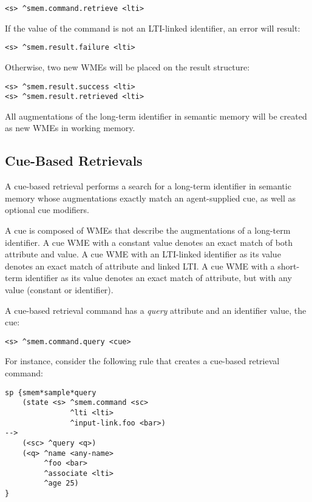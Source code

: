 \begin{verbatim}
<s> ^smem.command.retrieve <lti>
\end{verbatim}

If the value of the command is not an LTI-linked identifier, an error will result: 

\begin{verbatim}
<s> ^smem.result.failure <lti>
\end{verbatim}

Otherwise, two new WMEs will be placed on the result structure:

\begin{verbatim}
<s> ^smem.result.success <lti>
<s> ^smem.result.retrieved <lti>
\end{verbatim}

All augmentations of the long-term identifier in semantic memory will be created as new WMEs in working memory.

\subsection{Cue-Based Retrievals}
A cue-based retrieval performs a search for a long-term identifier in semantic memory whose augmentations exactly match an agent-supplied cue, as well as optional cue modifiers.

A cue is composed of WMEs that describe the augmentations of a long-term identifier.  
A cue WME with a constant value denotes an exact match of both attribute and value.  
A cue WME with an LTI-linked identifier as its value denotes an exact match of attribute and linked LTI.  
A cue WME with a short-term identifier as its value denotes an exact match of attribute, but with any value (constant or identifier).  

A cue-based retrieval command has a \emph{query} attribute and an identifier value, the cue:

\begin{verbatim}
<s> ^smem.command.query <cue>
\end{verbatim}

For instance, consider the following rule that creates a cue-based retrieval command:

\begin{verbatim}
sp {smem*sample*query
    (state <s> ^smem.command <sc>
               ^lti <lti>
               ^input-link.foo <bar>)
-->
    (<sc> ^query <q>)
    (<q> ^name <any-name>
         ^foo <bar>
         ^associate <lti>
         ^age 25)
}
\end{verbatim}

